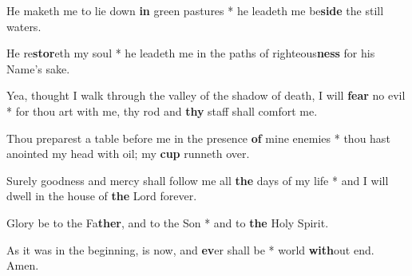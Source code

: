 \begin{multicols}{2}
	He maketh me to lie down \textbf{in} green pastures * he leadeth me be\textbf{side} the still waters.
	
	He re\textbf{stor}eth my soul * he leadeth me in the paths of righteous\textbf{ness} for his Name's sake.
	
	Yea, thought I walk through the valley of the shadow of death, I will \textbf{fear} no evil * for thou art with me, thy rod and \textbf{thy} staff shall comfort me.
	
	Thou preparest a table before me in the presence \textbf{of} mine enemies * thou hast anointed my head with oil; my \textbf{cup} runneth over.
	
	Surely goodness and mercy shall follow me all \textbf{the} days of my life * and I will dwell in the house of \textbf{the} Lord forever.
	
	Glory be to the Fa\textbf{ther}, and to the Son * and to \textbf{the} Holy Spirit.
	
	As it was in the beginning, is now, and \textbf{ev}er shall be * world \textbf{with}out end. Amen.
\end{multicols}